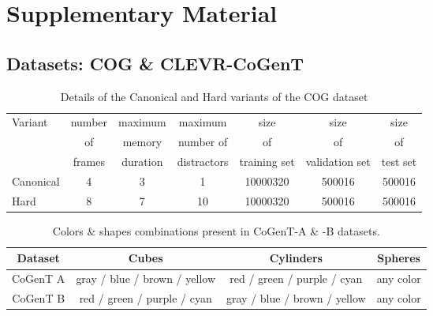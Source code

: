 \section{Supplementary Material}

\subsection{Datasets: COG \& CLEVR-CoGenT}
\label{sec:datasets-desc}

\begin{table}[ht]
	\centering
	\begin{adjustbox}{width=0.5\textwidth}
	\begin{tabular}{lcccccc}
		\toprule
		Variant    &  	number &  	maximum & maximum & size & size & size  \\ 
		& of   & memory & number of & of & of & of  \\
		& frames & duration & distractors & training set & validation set & test set \\
		\midrule
		Canonical & 4 & 3 & 1 & 10000320 & 500016 & 500016 \\	
		Hard  & 8 & 7 & 10 & 10000320 & 500016  & 500016 \\
		\bottomrule	
	\end{tabular}
	\end{adjustbox}
	\caption{Details of the Canonical and Hard variants of the COG dataset}
	\label{tab:cog_variants_supplement}
\end{table}

\begin{table}[ht]
	\centering
	\begin{adjustbox}{width=0.5\textwidth}
	\begin{tabular}{cccc}
		\toprule
		Dataset        & Cubes              & Cylinders &  Spheres         \\
		\midrule
		CoGenT A & gray / blue / brown / yellow  & red / green / purple / cyan       &    any color  \\
		CoGenT B  & red / green / purple / cyan &   gray / blue / brown / yellow       &      any color  \\
		\bottomrule
	\end{tabular}
	\end{adjustbox}
	\caption{Colors \& shapes combinations present in CoGenT-A \& -B datasets.}
    \label{tab:cogent_conditions}
\end{table}

